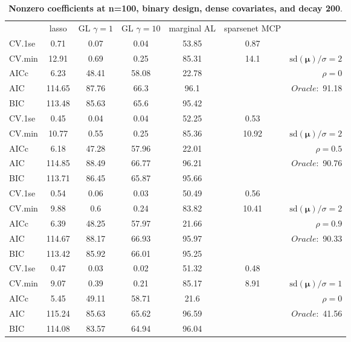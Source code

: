 \begin{table}\vspace{-.5cm}
\caption[l]{ { \bf Nonzero coefficients at n=100, binary design, 
dense covariates, and  decay  200}.}
\vspace{-.5cm}
\footnotesize{}
\begin{center}
\begin{tabular}{l*{5}{c}|r}
& lasso & GL $\gamma=1$ & GL $\gamma=10$ & marginal AL & sparsenet MCP  & \\
 \cline{1-7}
CV.1se & 0.71 & 0.07 & 0.04 & 53.85 & 0.87 & \\
CV.min & 12.91 & 0.69 & 0.25 & 85.31 & 14.1 &  $\mathrm{sd}(\mathbf{\mu})/\sigma=2$ \\
AICc & 6.23 & 48.41 & 58.08 & 22.78 & & $\rho=0$ \\
AIC & 114.65 & 87.76 & 66.3 & 96.1 & &  \multirow{2}{*}{$Oracle: $ 91.18} \\
BIC & 113.48 & 85.63 & 65.6 & 95.42 & &  \\
 \hline 
CV.1se & 0.45 & 0.04 & 0.04 & 52.25 & 0.53 & \\
CV.min & 10.77 & 0.55 & 0.25 & 85.36 & 10.92 &  $\mathrm{sd}(\mathbf{\mu})/\sigma=2$ \\
AICc & 6.18 & 47.28 & 57.96 & 22.01 & & $\rho=0.5$ \\
AIC & 114.85 & 88.49 & 66.77 & 96.21 & &  \multirow{2}{*}{$Oracle: $ 90.76} \\
BIC & 113.71 & 86.45 & 65.87 & 95.66 & &  \\
 \hline 
CV.1se & 0.54 & 0.06 & 0.03 & 50.49 & 0.56 & \\
CV.min & 9.88 & 0.6 & 0.24 & 83.82 & 10.41 &  $\mathrm{sd}(\mathbf{\mu})/\sigma=2$ \\
AICc & 6.39 & 48.25 & 57.97 & 21.66 & & $\rho=0.9$ \\
AIC & 114.67 & 88.17 & 66.93 & 95.97 & &  \multirow{2}{*}{$Oracle: $ 90.33} \\
BIC & 113.42 & 85.92 & 66.01 & 95.25 & &  \\
 \hline 
CV.1se & 0.47 & 0.03 & 0.02 & 51.32 & 0.48 & \\
CV.min & 9.07 & 0.39 & 0.21 & 85.17 & 8.91 &  $\mathrm{sd}(\mathbf{\mu})/\sigma=1$ \\
AICc & 5.45 & 49.11 & 58.71 & 21.6 & & $\rho=0$ \\
AIC & 115.24 & 85.63 & 65.62 & 96.59 & &  \multirow{2}{*}{$Oracle: $ 41.56} \\
BIC & 114.08 & 83.57 & 64.94 & 96.04 & &  \\

\end{tabular}
\end{center}
\end{table}
